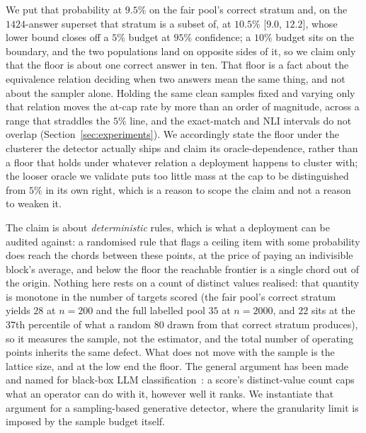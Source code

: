 We put that probability at $9.5\%$ on the fair pool's correct stratum and, on the
$1424$-answer superset that stratum is a subset of, at $10.5\%$ [$9.0$, $12.2$], whose lower
bound closes off a $5\%$
budget at $95\%$ confidence; a $10\%$ budget sits on the boundary, and the two populations
land on opposite sides of it, so we claim only that the floor is about one correct answer in
ten. That floor is a fact about the equivalence relation deciding when two answers mean the
same thing, and not about the sampler alone. Holding the same clean samples fixed and varying
only that relation moves the at-cap rate by more than an order of magnitude, across a range
that straddles the $5\%$ line, and the exact-match and NLI intervals do not overlap
(Section~\ref{sec:experiments}). We accordingly state the floor under the clusterer the
detector actually ships and claim its oracle-dependence, rather than a floor that holds under
whatever relation a deployment happens to cluster with; the looser oracle we validate puts
too little mass at the cap to be distinguished from $5\%$ in its own right, which is a reason
to scope the claim and not a reason to weaken it.

The claim is about \emph{deterministic} rules, which is what a deployment can be audited
against: a randomised rule that flags a ceiling item with some probability does reach the
chords between these points, at the price of paying an indivisible block's average, and below
the floor the reachable frontier is a single chord out of the origin. Nothing here rests on a count of
distinct values realised: that quantity is monotone in the number of targets scored (the
fair pool's correct stratum yields $28$ at $n{=}200$ and the full labelled pool $35$ at
$n{=}2000$, and $22$ sits at the $37$th percentile of what a random $80$ drawn from that
correct stratum produces), so it measures the sample, not the estimator, and
the total number of operating points inherits the same defect. What does not move with the
sample is the lattice size, and at the low end the floor. The general argument has been made
and named for black-box LLM classification~\citep{sun2026granularity}: a score's
distinct-value count caps what an operator can do with it, however well it ranks. We
instantiate that argument for a sampling-based generative detector, where the granularity
limit is imposed by the sample budget itself.


